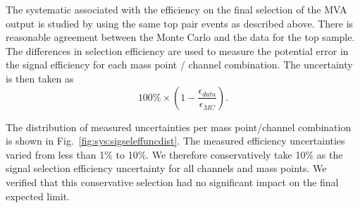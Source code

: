 The systematic associated with the efficiency on the final selection
of the MVA output
is studied by using the same
top pair events as described above.  There is reasonable agreement
between the Monte Carlo and the data for the top sample. The
differences in selection efficiency are used to measure the potential
error in the signal efficiency for each mass point / channel
combination. The uncertainty is then taken as
\[
 100\% \times (1 - \frac{\epsilon_{data}}{\epsilon_{MC}}).
\]

The distribution of measured uncertainties per mass point/channel
combination is shown in Fig.~\ref{fig:sys:sigseleffuncdist}. The measured
efficiency uncertainties varied from less than 1\% to 10\%.
We therefore conservatively take 10\%
as the signal selection efficiency uncertainty for all channels and
mass points.
We verified that
this conservative selection had no significant impact on the final
expected limit.


